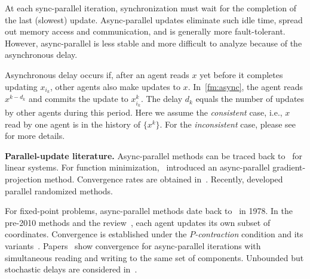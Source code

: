 At each sync-parallel iteration, synchronization must wait for the completion of the last (slowest) update. %
Async-parallel updates eliminate such idle time, spread out memory access and  communication, and is generally  more fault-tolerant. However, async-parallel is less stable and more difficult to analyze because of the asynchronous delay.

Asynchronous delay occurs if, after an agent reads $x$ yet before it completes updating $x_{i_k}$, other agents also make updates to $x$. In~\eqref{fm:async}, the agent reads $x^{k-d_k}$ and commits the update to $x_{i_k}^k$. The delay $d_k$ equals the number of updates by other agents during this period. Here we assume the \emph{consistent} case, i.e., $x$ read by one agent is in the history of $\{x^k\}$. For the \emph{inconsistent} case, please see~\cite[Section 1.2]{Peng_2015_AROCK} for more details.



\textbf{Parallel-update literature.} 
Async-parallel methods can be traced back to~\cite{chazan1969chaotic} for linear systems. For function minimization,~\cite{bertsekas1989parallel} introduced an async-parallel gradient-projection method. Convergence rates are obtained in~\cite{tseng1991rate-asyn}.  
Recently, \cite{bradley2011parallel,richtarik2012parallel} developed parallel randomized methods. 

For fixed-point problems, async-parallel methods date back to~\cite{Baudet_1978_asynchronous} in 1978. In  the pre-2010 methods \cite{BMR1997asyn-multisplit,bertsekas1983distributed,Baz200591,el1998flexible} and the review~\cite{Frommer2000201}, each agent updates its own subset of coordinates. Convergence is established under the \emph{$P$-contraction} condition and its variants~\cite{bertsekas1983distributed}. Papers~\cite{Baz200591,Baz1998429} show convergence for async-parallel iterations with simultaneous reading and writing to the same set of components. Unbounded but stochastic delays are considered in~\cite{Strikwerda2002125}.

